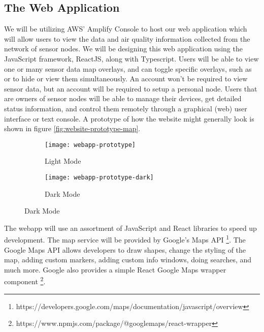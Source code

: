 \subsection{The Web Application}
We will be utilizing AWS' Amplify Console to host our web application which will allow users to view
the data and air quality information collected from the network of sensor nodes. We will be
designing this web application using the JavaScript framework, ReactJS, along with Typescript. Users
will be able to view one or many sensor data map overlays, and can toggle specific overlays, such as
\sdo or \ndo to hide or view them simultaneously. An account won't be required to view sensor data,
but an account will be required to setup a personal node. Users that are owners of sensor nodes will
be able to manage their devices, get detailed status information, and control them remotely through
a graphical (web) user interface or text console. A prototype of how the website might generally
look is shown in figure \ref{fig:website-prototype-map}. 

\begin{figure}
  \centering
  \caption[Web Application Map View Prototype]{
    Web Application Map View Prototype\protect\footnotemark
  }
  \label{fig:website-prototype-map} 

  \begin{subfigure}[b]{\textwidth}
    \texttt{[image: webapp-prototype]}
    \caption{Light Mode}
    \label{fig:website-prototype-map-light} 
  \end{subfigure}

  \hfill

  \begin{subfigure}[b]{\textwidth}
    \texttt{[image: webapp-prototype-dark]}
    \caption{Dark Mode}
    \label{fig:website-prototype-map-dark} 
  \end{subfigure}
\end{figure}


The webapp will use an assortment of JavaScript and React libraries to speed up development. The map
service will be provided by Google's Maps API
\footnote{https://developers.google.com/maps/documentation/javascript/overview}. The Google Maps API
allows developers to draw shapes, change the styling of the map, adding custom markers, adding
custom info windows, doing searches, and much more. Google also provides a simple React Google Maps
wrapper component \footnote{https://www.npmjs.com/package/@googlemaps/react-wrapper}.

